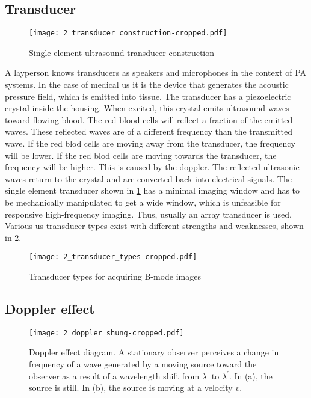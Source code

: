 \subsection{Transducer}

\begin{figure}[ht]
	\centering
	\texttt{[image: 2\_transducer\_construction-cropped.pdf]}
	\caption[Single element ultrasound transducer construction]{Single element ultrasound transducer construction \cite{JensenUltrasoundBook}}
	\label{fig:2_transducer_construction}
\end{figure}

A layperson knows transducers as speakers and microphones in the context of PA systems. In the case of medical \gls{us} it is the device that generates the acoustic pressure field, which is emitted into tissue. The transducer has a piezoelectric crystal inside the housing. When excited, this crystal emits ultrasound waves toward flowing blood. The red blood cells will reflect a fraction of the emitted waves. These reflected waves are of a different frequency than the transmitted wave. If the red blod cells are moving away from the transducer, the frequency will be lower. If the red blod cells are moving towards the transducer, the frequency will be higher. This is caused by the \gls{doppler}. The reflected ultrasonic waves return to the crystal and are converted back into electrical signals. The single element transducer shown in \cref{fig:2_transducer_construction} has a minimal imaging window and has to be mechanically manipulated to get a wide window, which is unfeasible for responsive high-frequency imaging. Thus, usually an array transducer is used. Various \gls{us} transducer types exist with different strengths and weaknesses, shown in \cref{fig:2_transducer_types}. 

\begin{figure}[ht]
	\centering
	\texttt{[image: 2\_transducer\_types-cropped.pdf]}
	\caption[Transducer types for acquiring B-mode images]{Transducer types for acquiring B-mode images \cite{JensenUltrasoundBook}}
	\label{fig:2_transducer_types}
\end{figure}

\subsection{Doppler effect} \label{sec:doppler_effect}

\begin{figure}[ht]
	\centering
	\texttt{[image: 2\_doppler\_shung-cropped.pdf]}
	\caption[Doppler effect diagram]{Doppler effect diagram. A stationary observer perceives a change in frequency of a wave generated by a moving source toward the observer as a result of a wavelength shift from $\lambda\ $ to $\lambda^{\prime}$. In (a), the source is still. In (b), the source is moving at a velocity $v$. \cite{ShungUltrasound_Book}}
	\label{fig:2_doppler_effect}
\end{figure}


